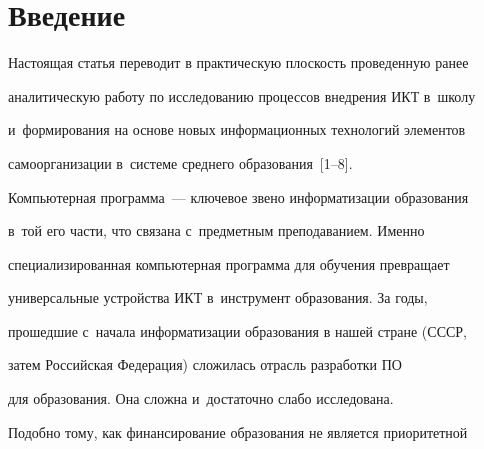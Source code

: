 














      \thispagestyle{headings}



  \section{Введение}



    \vspace*{-2pt}



  Настоящая статья переводит в практическую плоскость проведенную ранее

аналитическую работу по исследованию процессов внедрения ИКТ в~школу

и~формирования на основе новых информационных технологий элементов

самоорганизации в~системе среднего образования~[1--8].



  Компьютерная программа~--- ключевое звено информатизации образования

в~той его части, что связана с~предметным преподаванием. Именно

специализированная компьютерная программа для обучения превращает

универсальные устройства ИКТ в~инструмент образования. За годы,

прошедшие с~начала информатизации образования в нашей стране (СССР,

затем Российская Федерация) сложилась отрасль разработки ПО

для образования. Она сложна и~достаточно слабо исследована.

Подобно тому, как финансирование образования не является приоритетной

